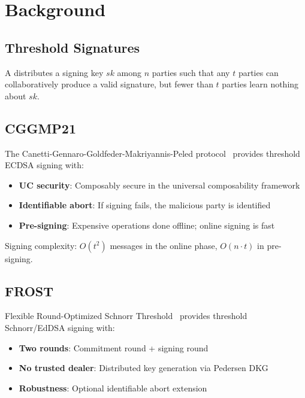 \section{Background}


\subsection{Threshold Signatures}

\begin{definition}
A \TSS{} distributes a signing key $sk$ among $n$ parties such that any $t$ parties can collaboratively produce a valid signature, but fewer than $t$ parties learn nothing about $sk$.
\end{definition}

\subsection{CGGMP21}

The Canetti-Gennaro-Goldfeder-Makriyannis-Peled protocol~\cite{cggmp2021} provides threshold ECDSA signing with:

\begin{itemize}
    \item \textbf{UC security}: Composably secure in the universal composability framework
    \item \textbf{Identifiable abort}: If signing fails, the malicious party is identified
    \item \textbf{Pre-signing}: Expensive operations done offline; online signing is fast
\end{itemize}

Signing complexity: $O(t^2)$ messages in the online phase, $O(n \cdot t)$ in pre-signing.

\subsection{FROST}

Flexible Round-Optimized Schnorr Threshold~\cite{komlo2020frost} provides threshold Schnorr/EdDSA signing with:

\begin{itemize}
    \item \textbf{Two rounds}: Commitment round + signing round
    \item \textbf{No trusted dealer}: Distributed key generation via Pedersen DKG
    \item \textbf{Robustness}: Optional identifiable abort extension
\end{itemize}

